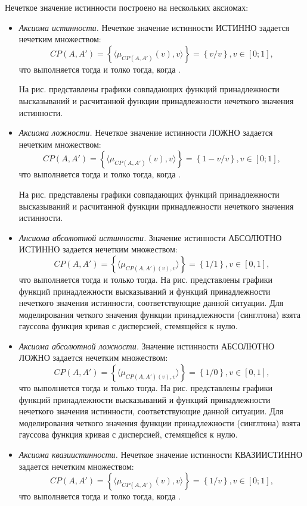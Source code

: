 Нечеткое значение истинности построено на нескольких аксиомах:
\begin{itemize}
\item \textit{Аксиома истинности.} Нечеткое значение истинности ИСТИННО задается нечетким множеством:
\begin{equation*} 
CP(A,A') = \left\{\langle\mu_{CP(A,A')}(v), v\rangle\right\} = \left\{v/v\right\}, v \in [0; 1],
\end{equation*}
что выполняется тогда и толко тогда, когда .

На рис. представлены графики совпадающих функций принадлежности высказываний и расчитанной функции принадлежности нечеткого значения истинности.
\item \textit{Аксиома ложности.} Нечеткое значение истинности ЛОЖНО задается нечетким множеством:
\begin{equation*} 
CP(A,A') = \left\{\langle\mu_{CP(A,A')}(v), v\rangle\right\} = \left\{1-v/v\right\}, v \in [0; 1],
\end{equation*}
что выполняется тогда и толко тогда, когда .

На рис. представлены графики совпадающих функций принадлежности высказываний и расчитанной функции принадлежности нечеткого значения истинности.
\item \textit{Ансиома абсолютной истинности.}  Значение истинности АБСОЛЮТНО ИСТИННО задается нечетким множеством:
\begin{equation*}
CP(A, A') = \left\{\langle\mu_{CP(A, A')(v), v}\rangle\right\} = \left\{1/1\right\}, v \in [0, 1],
\end{equation*}
что выполняется тогда и только тогда.
На рис. представлены графики функций принадлежности высказываний и функций принадлежности нечеткого значения истинности, соответствующие данной ситуации. Для моделирования четкого значения функции принадлежности (синглтона) взята гауссова функция кривая с дисперсией, стемящейся к нулю.
\item \textit{Аксиома абсолютной ложности.}  Значение истинности АБСОЛЮТНО ЛОЖНО задается нечетким множеством:
\begin{equation*}
CP(A, A') = \left\{\langle\mu_{CP(A, A')(v), v}\rangle\right\} = \left\{1/0\right\}, v \in [0, 1],
\end{equation*}
что выполняется тогда и только тогда.
На рис. представлены графики функций принадлежности высказываний и функций принадлежности нечеткого значения истинности, соответствующие данной ситуации. Для моделирования четкого значения функции принадлежности (синглтона) взята гауссова функция кривая с дисперсией, стемящейся к нулю.
\item \textit{Аксиома квазиистинности.} Нечеткое значение истинности КВАЗИИСТИННО задается нечетким множеством:
\begin{equation*} 
CP(A,A') = \left\{\langle\mu_{CP(A,A')}(v), v\rangle\right\} = \left\{1/v\right\}, v \in [0; 1],
\end{equation*}
что выполняется тогда и толко тогда, когда .


\end{itemize}
